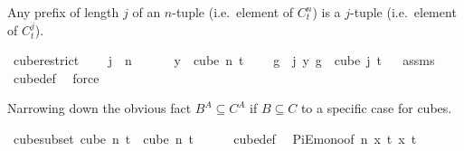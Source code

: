 \begin{isabellebody}
\isadelimproof
%
\endisadelimproof
%
\begin{isamarkuptext}%
Any prefix of length $j$ of an $n$-tuple (i.e.\ element of $C^n_t$) is a $j$-tuple (i.e.\ element of $C^j_t$).%
\end{isamarkuptext}\isamarkuptrue%
\isamarkupfalse%
\ cube{\isacharunderscore}{\kern0pt}restrict{\isacharcolon}{\kern0pt}\ \isanewline
\ \ \ {\isachardoublequoteopen}j\ {\isacharless}{\kern0pt}\ n{\isachardoublequoteclose}\ \isanewline
\ \ \ \ \ {\isachardoublequoteopen}y\ {\isasymin}\ cube\ n\ t{\isachardoublequoteclose}\ \isanewline
\ \ \ {\isachardoublequoteopen}{\isacharparenleft}{\kern0pt}{\isasymlambda}g\ {\isasymin}\ {\isacharbraceleft}{\kern0pt}{\isachardot}{\kern0pt}{\isachardot}{\kern0pt}{\isacharless}{\kern0pt}j{\isacharbraceright}{\kern0pt}{\isachardot}{\kern0pt}\ y\ g{\isacharparenright}{\kern0pt}\ {\isasymin}\ cube\ j\ t{\isachardoublequoteclose}%
\isadelimproof
\ %
\endisadelimproof
%
\isatagproof
{}\isamarkupfalse%
\ assms\ \isamarkupfalse%
\ cube{\isacharunderscore}{\kern0pt}def\ \isamarkupfalse%
\ force%
\endisatagproof
{\isafoldproof}%
%
\isadelimproof
%
\endisadelimproof
%
\begin{isamarkuptext}%
Narrowing down the obvious fact $B^A \subseteq C^A$ if $B \subseteq C$ to a specific case for cubes.%
\end{isamarkuptext}\isamarkuptrue%
\isamarkupfalse%
\ cube{\isacharunderscore}{\kern0pt}subset{\isacharcolon}{\kern0pt}\ {\isachardoublequoteopen}cube\ n\ t\ {\isasymsubseteq}\ cube\ n\ {\isacharparenleft}{\kern0pt}t\ {\isacharplus}{\kern0pt}\ {}{\isacharparenright}{\kern0pt}{\isachardoublequoteclose}\isanewline
%
\isadelimproof
\ \ %
\endisadelimproof
%
\isatagproof
{}\isamarkupfalse%
\ cube{\isacharunderscore}{\kern0pt}def\ \isamarkupfalse%
\ PiE{\isacharunderscore}{\kern0pt}mono{\isacharbrackleft}{\kern0pt}of\ {\isachardoublequoteopen}{\isacharbraceleft}{\kern0pt}{\isachardot}{\kern0pt}{\isachardot}{\kern0pt}{\isacharless}{\kern0pt}n{\isacharbraceright}{\kern0pt}{\isachardoublequoteclose}\ {\isachardoublequoteopen}{\isasymlambda}x{\isachardot}{\kern0pt}\ {\isacharbraceleft}{\kern0pt}{\isachardot}{\kern0pt}{\isachardot}{\kern0pt}{\isacharless}{\kern0pt}t{\isacharbraceright}{\kern0pt}{\isachardoublequoteclose}\ {\isachardoublequoteopen}{\isasymlambda}x{\isachardot}{\kern0pt}\ {\isacharbraceleft}{\kern0pt}{\isachardot}{\kern0pt}{\isachardot}{\kern0pt}{\isacharless}{\kern0pt}t{\isacharplus}{\kern0pt}{}{\isacharbraceright}{\kern0pt}{\isachardoublequoteclose}{\isacharbrackright}{\kern0pt}\isanewline

\end{isabellebody}
